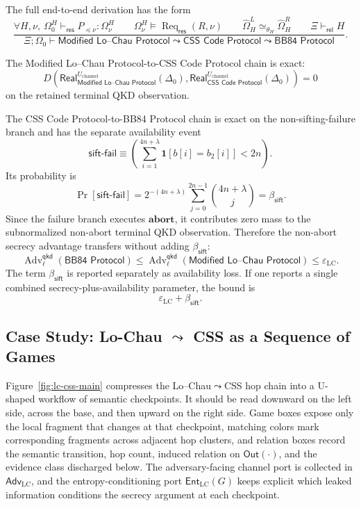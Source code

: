 \documentclass{report}
\theoremstyle{defn_style}
\providecommand{\Req}{\operatorname{Req}_{\mathsf{res}}}
\begin{document}
The full end-to-end derivation has the form
\[
\frac{
  \forall H,\nu,\ 
  \Omega_0^H\vdash_{\mathsf{res}}P_{\preceq\nu}:\Omega_\nu^H
  \qquad
  \Omega_\nu^H\models\Req(R,\nu)
  \qquad
  \widehat\Omega_H^L\simeq_{\theta_H}\widehat\Omega_H^R
  \qquad
  \Xi\vdash_{\mathsf{rel}}H
}{
  \Xi;\Omega_0
  \vdash
  \textsf{Modified Lo--Chau Protocol}
  \leadsto
  \textsf{CSS Code Protocol}
  \leadsto
  \textsf{BB84 Protocol}
}.
\tag{EndToEnd-ResourceRel}
\]

The Modified Lo--Chau Protocol-to-CSS Code Protocol chain is exact:
\[
D\!\left(
\mathsf{Real}_{\textsf{Modified Lo--Chau Protocol}}^{U_{\mathrm{channel}}}(\Delta_0),
\mathsf{Real}_{\textsf{CSS Code Protocol}}^{U_{\mathrm{channel}}}(\Delta_0)
\right)
=0
\tag{LC-CSS-Exact}
\]
on the retained terminal QKD observation.

The CSS Code Protocol-to-BB84 Protocol chain is exact on the
non-sifting-failure branch and has the separate availability event
\[
\mathsf{sift\mbox{-}fail}
\equiv
\left(
  \sum_{i=1}^{4n+\lambda}
  \mathbf 1[b[i]=b_2[i]]
  <2n
\right).
\]
Its probability is
\[
\Pr[\mathsf{sift\mbox{-}fail}]
=
2^{-(4n+\lambda)}
\sum_{j=0}^{2n-1}
\binom{4n+\lambda}{j}
=
\beta_{\mathsf{sift}}.
\tag{SiftFailProb}
\]
Since the failure branch executes \(\mathbf{abort}\), it contributes zero mass
to the subnormalized non-abort terminal QKD observation.  Therefore the
non-abort secrecy advantage transfers without adding
\(\beta_{\mathsf{sift}}\):
\[
\operatorname{Adv}^{\mathsf{qkd}}_{\ell}(\textsf{BB84 Protocol})
\le
\operatorname{Adv}^{\mathsf{qkd}}_{\ell}(\textsf{Modified Lo--Chau Protocol})
\le
\varepsilon_{\mathrm{LC}}.
\tag{NonAbortSecrecy}
\]
The term \(\beta_{\mathsf{sift}}\) is reported separately as availability loss.
If one reports a single combined secrecy-plus-availability parameter, the bound
is
\[
\varepsilon_{\mathrm{LC}}+\beta_{\mathsf{sift}}.
\tag{CombinedBound}
\]


\subsection{\texorpdfstring{Case Study: Lo-Chau $\leadsto$ CSS as a Sequence of Games}{Case Study: Lo-Chau to CSS as a Sequence of Games}}

Figure~\ref{fig:lc-css-main} compresses the Lo--Chau$\leadsto$CSS hop
chain into a U-shaped workflow of semantic checkpoints.
It should be read downward on the left side, across the base, and then
upward on the right side.
Game boxes expose only the local fragment that changes at that
checkpoint, matching colors mark corresponding fragments across
adjacent hop clusters, and relation boxes record the semantic transition, hop
count, induced relation on $\mathsf{Out}(\cdot)$, and the evidence
class discharged below.
The adversary-facing channel port is collected in
$\mathsf{Adv}_{\mathrm{LC}}$, and the entropy-conditioning port
$\mathsf{Ent}_{\mathrm{LC}}(G)$ keeps explicit which leaked information
conditions the secrecy argument at each checkpoint.
\end{document}
